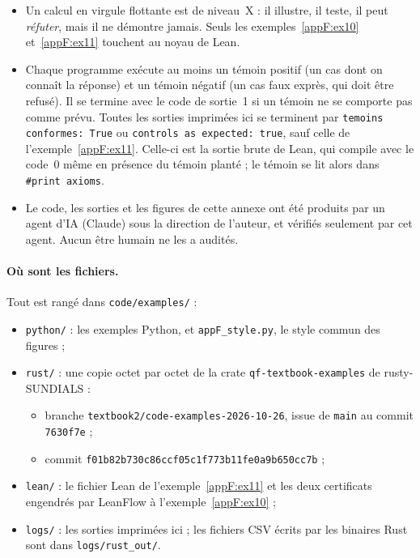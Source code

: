 \begin{warnbox}
\begin{itemize}
\item Un calcul en virgule flottante est de niveau~X : il illustre, il teste, il peut \emph{réfuter}, mais il ne
démontre jamais. Seuls les exemples~\ref{appF:ex10} et~\ref{appF:ex11} touchent au noyau de Lean.
\item Chaque programme exécute au moins un témoin positif (un cas dont on connaît la réponse) et un témoin négatif (un
cas faux exprès, qui doit être refusé). Il se termine avec le code de sortie~1 si un témoin ne se comporte pas comme
prévu. Toutes les sorties imprimées ici se terminent par \texttt{temoins conformes: True} ou
\texttt{controls as expected: true}, sauf celle de l'exemple~\ref{appF:ex11}. Celle-ci est la sortie brute de Lean,
qui compile avec le code~0 même en présence du témoin planté ; le témoin se lit alors dans \texttt{\#print axioms}.
\item Le code, les sorties et les figures de cette annexe ont été produits par un agent d'IA (Claude) sous la direction
de l'auteur, et vérifiés seulement par cet agent. Aucun être humain ne les a audités.
\end{itemize}
\end{warnbox}

\paragraph{Où sont les fichiers.} Tout est rangé dans \texttt{code/examples/} :
\begin{itemize}
\item \texttt{python/} : les exemples Python, et \texttt{appF\_style.py}, le style commun des figures ;
\item \texttt{rust/} : une copie octet par octet de la crate \texttt{qf-textbook-examples} de rusty-SUNDIALS :
\begin{itemize}
\item branche \texttt{textbook2/code-examples-2026-10-26}, issue de \texttt{main} au commit \texttt{7630f7e} ;
\item commit \texttt{f01b82b730c86ccf05c1f773b11fe0a9b650cc7b} ;
\end{itemize}
\item \texttt{lean/} : le fichier Lean de l'exemple~\ref{appF:ex11} et les deux certificats engendrés par LeanFlow à
l'exemple~\ref{appF:ex10} ;
\item \texttt{logs/} : les sorties imprimées ici ; les fichiers CSV écrits par les binaires Rust sont dans
\texttt{logs/rust\_out/}.
\end{itemize}


